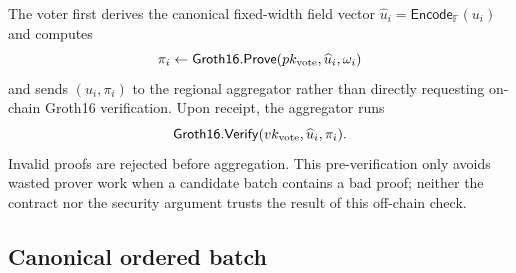 \documentclass[pdflatex,sn-mathphys-num]{sn-jnl}%
\theoremstyle{thmstyleone}%
\theoremstyle{thmstyletwo}%
\theoremstyle{thmstylethree}%
\begin{document}
The voter first derives the canonical fixed-width field vector $\widehat u_i=\mathsf{Encode}_{\mathbb F}(u_i)$ and computes
\[
 \pi_i\leftarrow\mathsf{Groth16.Prove}(pk_{\rm vote},\widehat u_i,\omega_i)
\]
and sends $(u_i,\pi_i)$ to the regional aggregator rather than directly requesting on-chain Groth16 verification. Upon receipt, the aggregator runs
\[
 \mathsf{Groth16.Verify}(vk_{\rm vote},\widehat u_i,\pi_i).
\]
Invalid proofs are rejected before aggregation. This pre-verification only avoids wasted prover work when a candidate batch contains a bad proof; neither the contract nor the security argument trusts the result of this off-chain check.

\subsection{Canonical ordered batch}\label{subsec:batch-format}
\end{document}

